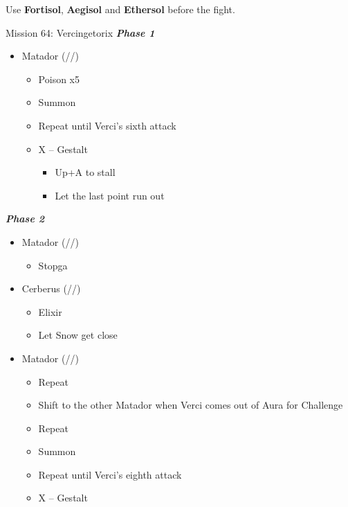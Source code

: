 \renewcommand{\first}{[1] Tri-Disaster (\rav/\rav/\rav)}
\renewcommand{\second}{[2] Cerberus (\com/\com/\com)}
\renewcommand{\third}{[3] Matador (\sab/\sen/\rav)}
\renewcommand{\fourth}{[4] Matador (\sab/\sen/\rav)}
\renewcommand{\fifth}{[5] Recuperation (\med/\syn/\syn)}
\renewcommand{\sixth}{[6] Tireless Charge (\com/\com/\med)}

Use \textbf{Fortisol}, \textbf{Aegisol} and \textbf{Ethersol} before the fight.
\vfill

\begin{battle}{Mission 64: Vercingetorix}
	\textit{\textbf{Phase 1}}
	\begin{itemize}
		\item \fourth
			\begin{itemize}
				\item Poison x5
				\item Summon
				\item Repeat until Verci's sixth attack
				\item X -- Gestalt
					\begin{itemize}
						\item Up+A to stall
						\item Let the last point run out
					\end{itemize}
			\end{itemize}
	\end{itemize}
	\textit{\textbf{Phase 2}}
	\begin{itemize}
		\item \fourth
			\begin{itemize}
				\item Stopga
			\end{itemize}
		\item \second
			\begin{itemize}
				\item Elixir
				\item Let Snow get close
			\end{itemize}
		\item \third
			\begin{itemize}
				\item Repeat
				\item Shift to the other Matador when Verci comes out of Aura for Challenge
				\item Repeat
				\item Summon
				\item Repeat until Verci's eighth attack
				\item X -- Gestalt
					\begin{itemize}

\end{itemize}
\end{itemize}
\end{itemize}
\end{battle}
